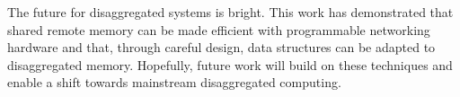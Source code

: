 \documentclass[12pt]{ucsddissertation}
\begin{document}
The future for disaggregated systems is bright. This work has demonstrated that shared remote memory
can be made efficient with programmable networking hardware and that, through careful design, data
structures can be adapted to disaggregated memory. Hopefully, future work will build on these
techniques and enable a shift towards mainstream disaggregated computing.








\end{document}
